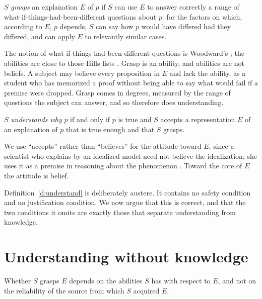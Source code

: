 \documentclass{situationist-preprint}
\begin{document}
\begin{definition}[Grasp]\label{d:grasp}
$S$ \emph{grasps} an explanation $E$ of $p$ if $S$ can use $E$ to answer correctly a range of what-if-things-had-been-different questions about $p$: for the factors on which, according to $E$, $p$ depends, $S$ can say how $p$ would have differed had they differed, and can apply $E$ to relevantly similar cases.
\end{definition}

The notion of what-if-things-had-been-different questions is Woodward's \citep{Woodward2003}; the abilities are close to those Hills lists \citep{Hills2016}. Grasp is an ability, and abilities are not beliefs. A subject may believe every proposition in $E$ and lack the ability, as a student who has memorized a proof without being able to say what would fail if a premise were dropped. Grasp comes in degrees, measured by the range of questions the subject can answer, and so therefore does understanding.

\begin{definition}\label{d:understand}
$S$ \emph{understands why} $p$ if and only if $p$ is true and $S$ accepts a representation $E$ of an explanation of $p$ that is true enough and that $S$ grasps.
\end{definition}

We use \enquote{accepts} rather than \enquote{believes} for the attitude toward $E$, since a scientist who explains by an idealized model need not believe the idealization; she uses it as a premise in reasoning about the phenomenon \citep{Elgin2017}. Toward the core of $E$ the attitude is belief.

Definition~\ref{d:understand} is deliberately austere. It contains no safety condition and no justification condition. We now argue that this is correct, and that the two conditions it omits are exactly those that separate understanding from knowledge.

\section{Understanding without knowledge}

\begin{principle}\label{p:basis}
Whether $S$ grasps $E$ depends on the abilities $S$ has with respect to $E$, and not on the reliability of the source from which $S$ acquired $E$.
\end{principle}
\end{document}
